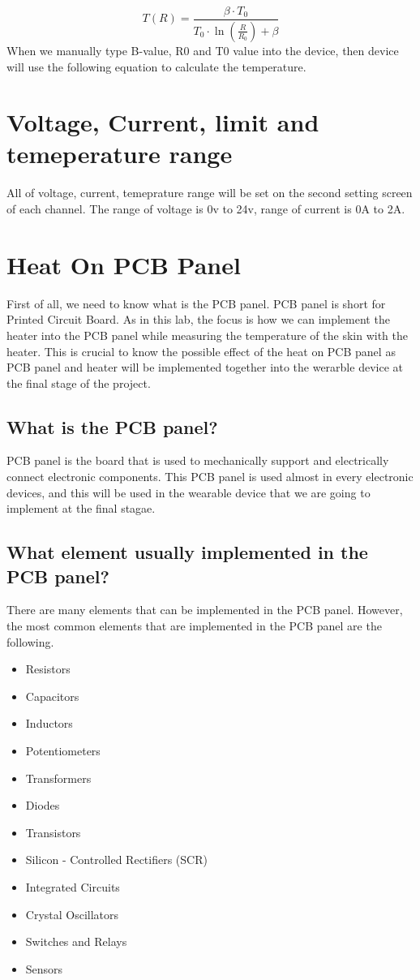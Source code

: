\documentclass{article}
\begin{document}
\begin{equation}
    T(R) = \frac{\beta \cdot T_0}{T_0 \cdot \ln\left(\frac{R}{R_0}\right) + \beta}
\end{equation}
When we manually type B-value, R0 and T0 value into the device, then device will use the following equation to calculate the temperature.
\section{Voltage, Current, limit and temeperature range}
All of voltage, current, temeprature range will be set on the second setting screen of each channel. 
The range of voltage is 0v to 24v, range of current is 0A to 2A. 
\section{Heat On PCB Panel}
First of all, we need to know what is the PCB panel.
PCB panel is short for Printed Circuit Board.
As in this lab, the focus is how we can implement the heater into the PCB panel while measuring the temperature
of the skin with the heater.
This is crucial to know the possible effect of the heat on PCB panel 
as PCB panel and heater will be implemented together into the werarble device at the final stage of the project.
\subsection{What is the PCB panel?}
PCB panel is the board that is used to mechanically support and electrically connect electronic components.
This PCB panel is used almost in every electronic devices, and this will be used in the wearable device that we are 
going to implement at the final stagae. 
\subsection{What element usually implemented in the PCB panel?}
There are many elements that can be implemented in the PCB panel.
However, the most common elements that are implemented in the PCB panel are the following.
\begin{itemize}
    \item Resistors
    \item Capacitors
    \item Inductors
    \item Potentiometers
    \item Transformers
    \item Diodes
    \item Transistors
    \item Silicon - Controlled Rectifiers (SCR)
    \item Integrated Circuits
    \item Crystal Oscillators 
    \item Switches and Relays
    \item Sensors
\end{itemize}
\end{document}
